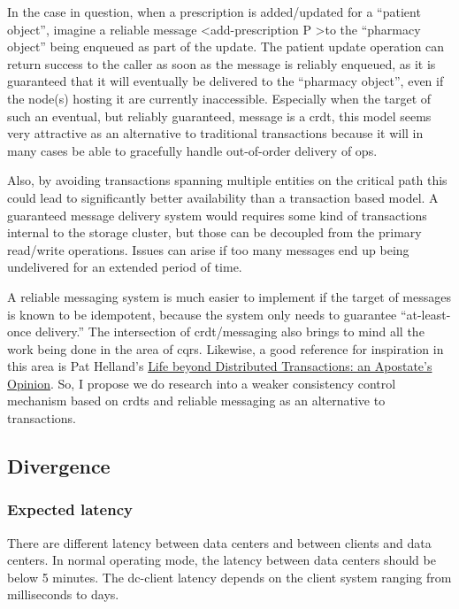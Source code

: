 \documentclass[11pt,a4paper]{report}
\begin{document}
In the case in question, when a prescription is added/updated for a ``patient object'', imagine a reliable message  \textless add-prescription P \textgreater to the ``pharmacy object'' being enqueued as part of the update. The patient update operation can return success to the caller as soon as the message is reliably enqueued, as it is guaranteed that it will eventually be delivered to the ``pharmacy object'', even if the node(s) hosting it are currently inaccessible. Especially when the target of such an eventual, but reliably guaranteed, message is a \gls{crdt}, this model seems very attractive as an alternative to traditional transactions because it will in many cases be able to gracefully handle out-of-order delivery of ops.
  
Also, by avoiding transactions spanning multiple entities on the critical path this could lead to significantly better availability than a transaction based model.
A guaranteed message delivery system would requires some kind of transactions internal to the storage cluster, but those can be decoupled from the primary read/write operations. Issues can arise if too many messages end up being undelivered for an extended period of time.

A reliable messaging system is much easier to implement if the target of messages is known to be idempotent, because the system only needs to guarantee ``at-least-once delivery.''
The intersection of \gls{crdt}/messaging also brings to mind all the work being done in the area of \gls{cqrs}. Likewise, a good reference for inspiration in this area is Pat Helland's \hyperlink{http://www.ics.uci.edu/~cs223/papers/cidr07p15.pdf}{Life beyond Distributed Transactions: an Apostate's Opinion}. So, I propose we do research into a weaker consistency control mechanism based on \glspl{crdt} and reliable messaging as an alternative to transactions.

\subsection{Divergence}
\subsubsection{Expected latency}
There are different latency between data centers and between clients and data centers.
In normal operating mode, the latency between data centers should be below 5 minutes.
The \gls{dc}-client latency depends on the client system ranging from milliseconds to days.
\end{document}
